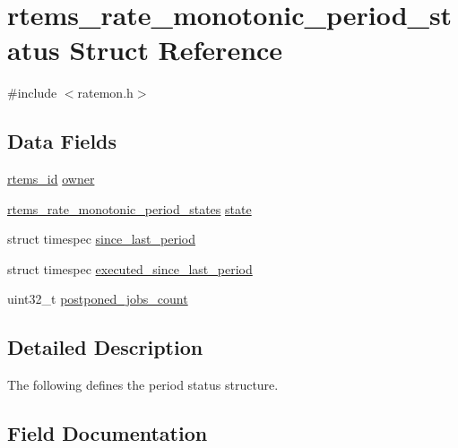 \hypertarget{structrtems__rate__monotonic__period__status}{}\section{rtems\+\_\+rate\+\_\+monotonic\+\_\+period\+\_\+status Struct Reference}
\label{structrtems__rate__monotonic__period__status}


{\ttfamily \#include $<$ratemon.\+h$>$}

\subsection*{Data Fields}
\begin{DoxyCompactItemize}
\item 
\mbox{\hyperlink{group__ClassicTasks_gab20892b814dced7dd4e5b9bf42becd57}{rtems\+\_\+id}} \mbox{\hyperlink{structrtems__rate__monotonic__period__status_ad255662d0fe541bf512da8ee2d1a14ec}{owner}}
\item 
\mbox{\hyperlink{group__ClassicRateMon_ga0fd6fa9e7304b022e004061d542ca743}{rtems\+\_\+rate\+\_\+monotonic\+\_\+period\+\_\+states}} \mbox{\hyperlink{structrtems__rate__monotonic__period__status_a6b196432be09cffb38d77cf8334c6f0c}{state}}
\item 
struct timespec \mbox{\hyperlink{structrtems__rate__monotonic__period__status_a66b584c6840c2e2ea134e2fa72789039}{since\+\_\+last\+\_\+period}}
\item 
struct timespec \mbox{\hyperlink{structrtems__rate__monotonic__period__status_af0ecbab77b4031f3a8d9e99eaff82d4f}{executed\+\_\+since\+\_\+last\+\_\+period}}
\item 
uint32\+\_\+t \mbox{\hyperlink{structrtems__rate__monotonic__period__status_a488e2a6d7a15d2c73716661fd9eb92d5}{postponed\+\_\+jobs\+\_\+count}}
\end{DoxyCompactItemize}


\subsection{Detailed Description}
The following defines the period status structure. 

\subsection{Field Documentation}
\mbox{\label{structrtems__rate__monotonic__period__status_af0ecbab77b4031f3a8d9e99eaff82d4f}} 
